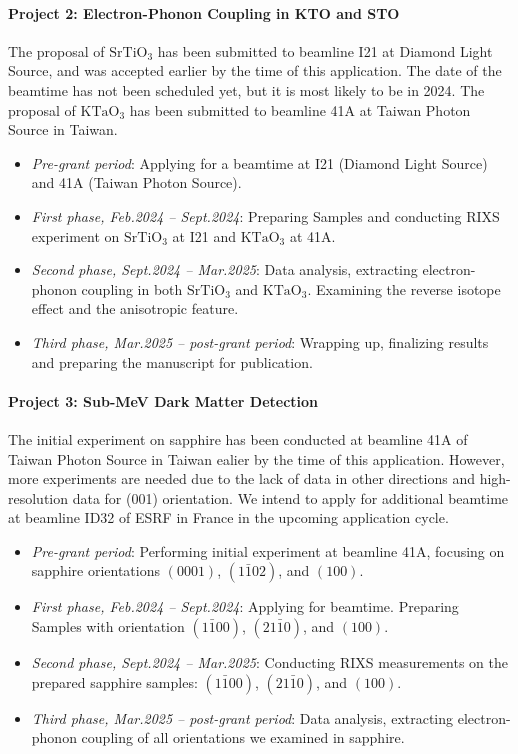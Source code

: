 \documentclass[11pt]{article}
\begin{document}
\paragraph{Project 2: Electron-Phonon Coupling in KTO and STO}
The proposal of $\mathrm{SrTiO_{3}}$ has been submitted to beamline I21 at Diamond Light Source, and was accepted earlier by the time of this application. The date of the beamtime has not been scheduled yet, but it is most likely to be in 2024. The proposal of $\mathrm{KTaO_{3}}$ has been submitted to beamline 41A at Taiwan Photon Source in Taiwan. 
\begin{itemize}
  \item \textit{Pre-grant period}: Applying for a beamtime at I21 (Diamond Light Source) and 41A (Taiwan Photon Source).
  \item \textit{First phase, Feb.2024 -- Sept.2024}: Preparing Samples and conducting RIXS experiment on $\mathrm{SrTiO_{3}}$ at I21 and $\mathrm{KTaO_{3}}$ at 41A. 
  \item \textit{Second phase, Sept.2024 -- Mar.2025}: Data analysis, extracting electron-phonon coupling in both $\mathrm{SrTiO_{3}}$ and $\mathrm{KTaO_{3}}$. Examining the reverse isotope effect and the anisotropic feature.
  \item \textit{Third phase, Mar.2025 -- post-grant period}:  Wrapping up,  finalizing results and preparing the manuscript for publication.
\end{itemize}

\paragraph{Project 3: Sub-MeV Dark Matter Detection}
The initial experiment on sapphire has been conducted at beamline 41A of Taiwan Photon Source in Taiwan ealier by the time of this application. However, more experiments are needed due to the lack of data in other directions and high-resolution data for (001) orientation. We intend to apply for additional beamtime at beamline ID32 of ESRF in France in the upcoming application cycle.
\begin{itemize}
  \item \textit{Pre-grant period}: Performing initial experiment at beamline 41A, focusing on sapphire orientations $(0001)$, $(1\bar{1}02)$, and $(100)$. 
  \item \textit{First phase, Feb.2024 -- Sept.2024}: Applying for beamtime. Preparing Samples with orientation $(1\bar{1}00)$, $(21\bar{1}0)$, and $(100)$. 
  \item \textit{Second phase, Sept.2024 -- Mar.2025}: Conducting RIXS measurements on the prepared sapphire samples: $(1\bar{1}00)$, $(21\bar{1}0)$, and $(100)$. 
  \item \textit{Third phase, Mar.2025 -- post-grant period}: Data analysis, extracting electron-phonon coupling of all orientations we examined in sapphire.
\end{itemize}
\end{document}
